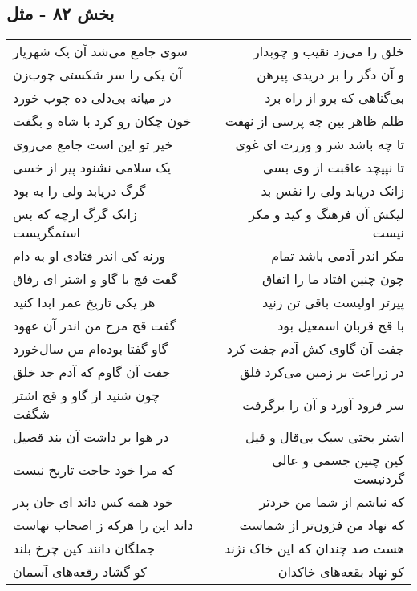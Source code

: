 \begin{center}
\section*{بخش ۸۲ - مثل}
\label{sec:sh082}
\begin{longtable}{l p{0.5cm} r}
سوی جامع می‌شد آن یک شهریار
&&
خلق را می‌زد نقیب و چوبدار
\\
آن یکی را سر شکستی چوب‌زن
&&
و آن دگر را بر دریدی پیرهن
\\
در میانه بی‌دلی ده چوب خورد
&&
بی‌گناهی که برو از راه برد
\\
خون چکان رو کرد با شاه و بگفت
&&
ظلم ظاهر بین چه پرسی از نهفت
\\
خیر تو این است جامع می‌روی
&&
تا چه باشد شر و وزرت ای غوی
\\
یک سلامی نشنود پیر از خسی
&&
تا نپیچد عاقبت از وی بسی
\\
گرگ دریابد ولی را به بود
&&
زانک دریابد ولی را نفس بد
\\
زانک گرگ ارچه که بس استمگریست
&&
لیکش آن فرهنگ و کید و مکر نیست
\\
ورنه کی اندر فتادی او به دام
&&
مکر اندر آدمی باشد تمام
\\
گفت قج با گاو و اشتر ای رفاق
&&
چون چنین افتاد ما را اتفاق
\\
هر یکی تاریخ عمر ابدا کنید
&&
پیرتر اولیست باقی تن زنید
\\
گفت قج مرج من اندر آن عهود
&&
با قج قربان اسمعیل بود
\\
گاو گفتا بوده‌ام من سال‌خورد
&&
جفت آن گاوی کش آدم جفت کرد
\\
جفت آن گاوم که آدم جد خلق
&&
در زراعت بر زمین می‌کرد فلق
\\
چون شنید از گاو و قج اشتر شگفت
&&
سر فرود آورد و آن را برگرفت
\\
در هوا بر داشت آن بند قصیل
&&
اشتر بختی سبک بی‌قال و قیل
\\
که مرا خود حاجت تاریخ نیست
&&
کین چنین جسمی و عالی گردنیست
\\
خود همه کس داند ای جان پدر
&&
که نباشم از شما من خردتر
\\
داند این را هرکه ز اصحاب نهاست
&&
که نهاد من فزون‌تر از شماست
\\
جملگان دانند کین چرخ بلند
&&
هست صد چندان که این خاک نژند
\\
کو گشاد رقعه‌های آسمان
&&
کو نهاد بقعه‌های خاکدان
\\
\end{longtable}
\end{center}
